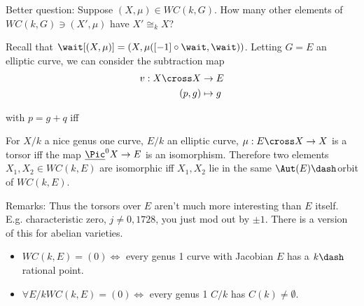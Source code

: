 Better question: Suppose \((X, \mu) \in WC(k, G)\). How many other
elements of \(WC(k, G) \ni (X', \mu)\) have \(X' \cong_k X\)?

Recall that \(\wait [(X, \mu)] = (X, \mu([-1]\circ \wait, \wait) )\).
Letting \(G = E\) an elliptic curve, we can consider the subtraction map
\begin{align*}
v: X\cross X &\to E \\
(p, g) &\mapsto g
\end{align*}

with \(p= g+q\) iff

\begin{center}\end{center}

For \(X/k\) a nice genus one curve, \(E/k\) an elliptic curve,
\(\mu: E\cross X \to X\) is a torsor iff the map
\(\underline{\Pic}^0 X \to E\) is an isomorphism. Therefore two elements
\(X_1, X_2 \in WC(k, E)\) are isomorphic iff \(X_1, X_2\) lie in the
same \(\Aut(E)\dash\)orbit of \(WC(k, E)\).

Remarks: Thus the torsors over \(E\) aren't much more interesting than
\(E\) itself. E.g. characteristic zero, \(j\neq 0, 1728\), you just mod
out by \(\pm 1\). There is a version of this for abelian varieties.

\begin{itemize}
\tightlist
\item
  \(WC(k, E) = (0) \iff\) every genus 1 curve with Jacobian \(E\) has a
  \(k\dash\)rational point.
\item
  \(\forall E/k WC(k, E) = (0) \iff\) every genus 1 \(C/k\) has
  \(C(k) \neq\emptyset\).
\end{itemize}

